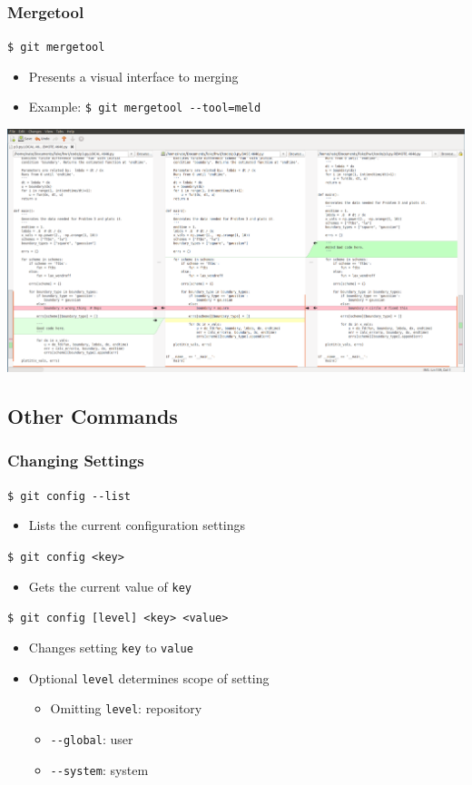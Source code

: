 \documentclass[english,compress]{beamer}
\begin{document}
\begin{frame}[fragile]
    \frametitle{Mergetool}

    \verb|$ git mergetool|
    \begin{itemize}
        \item Presents a visual interface to merging
        \item Example: \verb|$ git mergetool --tool=meld|
    \end{itemize}
    \begin{center}
        \includegraphics[width=.9\textwidth]{figs/meld-screenshot}
    \end{center}

\end{frame}

\subsection{Other Commands}
\begin{frame}[fragile]
    \frametitle{Changing Settings}

	\verb|$ git config --list|
	\begin{itemize}
		\item Lists the current configuration settings
	\end{itemize}
	\verb|$ git config <key>|
	\begin{itemize}
		\item Gets the current value of \verb|key|
	\end{itemize}
	\verb|$ git config [level] <key> <value>|
	\begin{itemize}
		\item Changes setting \verb|key| to \verb|value|
		\item Optional \verb|level| determines scope of setting
		\begin{itemize}
			\item Omitting \verb|level|: repository
			\item \verb|--global|: user
			\item \verb|--system|: system
		\end{itemize}
	\end{itemize}
\end{frame}
\end{document}
